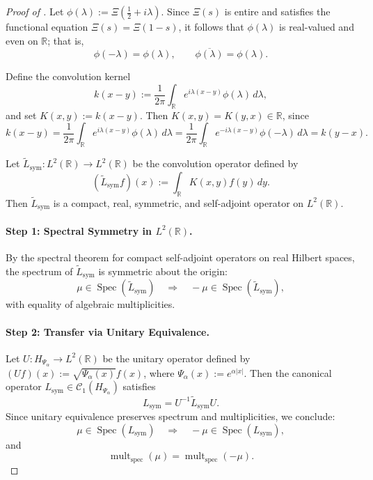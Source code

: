 \begin{proof}[Proof of ]
Let \( \phi(\lambda) := \Xi\left(\tfrac{1}{2} + i\lambda\right) \). Since \( \Xi(s) \) is entire and satisfies the functional equation \( \Xi(s) = \Xi(1 - s) \), it follows that \( \phi(\lambda) \) is real-valued and even on \( \mathbb{R} \); that is,
\[
\phi(-\lambda) = \phi(\lambda), \qquad \overline{\phi(\lambda)} = \phi(\lambda).
\]

Define the convolution kernel
\[
k(x - y) := \frac{1}{2\pi} \int_{\mathbb{R}} e^{i\lambda(x - y)} \phi(\lambda)\, d\lambda,
\]
and set \( K(x, y) := k(x - y) \). Then \( K(x, y) = K(y, x) \in \mathbb{R} \), since
\[
k(x - y) = \frac{1}{2\pi} \int_{\mathbb{R}} e^{i\lambda(x - y)} \phi(\lambda)\, d\lambda = \frac{1}{2\pi} \int_{\mathbb{R}} e^{-i\lambda(x - y)} \phi(-\lambda)\, d\lambda = k(y - x).
\]

Let \( \widetilde{L}_{\mathrm{sym}} \colon L^2(\mathbb{R}) \to L^2(\mathbb{R}) \) be the convolution operator defined by
\[
(\widetilde{L}_{\mathrm{sym}} f)(x) := \int_{\mathbb{R}} K(x, y) f(y)\, dy.
\]
Then \( \widetilde{L}_{\mathrm{sym}} \) is a compact, real, symmetric, and self-adjoint operator on \( L^2(\mathbb{R}) \).

\paragraph{Step 1: Spectral Symmetry in \( L^2(\mathbb{R}) \).}
By the spectral theorem for compact self-adjoint operators on real Hilbert spaces, the spectrum of \( \widetilde{L}_{\mathrm{sym}} \) is symmetric about the origin:
\[
\mu \in \operatorname{Spec}(\widetilde{L}_{\mathrm{sym}}) \quad \Longrightarrow \quad -\mu \in \operatorname{Spec}(\widetilde{L}_{\mathrm{sym}}),
\]
with equality of algebraic multiplicities.

\paragraph{Step 2: Transfer via Unitary Equivalence.}
Let \( U \colon H_{\Psi_\alpha} \to L^2(\mathbb{R}) \) be the unitary operator defined by \( (Uf)(x) := \sqrt{\Psi_\alpha(x)} f(x) \), where \( \Psi_\alpha(x) := e^{\alpha |x|} \). Then the canonical operator \( L_{\mathrm{sym}} \in \mathcal{C}_1(H_{\Psi_\alpha}) \) satisfies
\[
L_{\mathrm{sym}} = U^{-1} \widetilde{L}_{\mathrm{sym}} U.
\]
Since unitary equivalence preserves spectrum and multiplicities, we conclude:
\[
\mu \in \operatorname{Spec}(L_{\mathrm{sym}}) \quad \Longrightarrow \quad -\mu \in \operatorname{Spec}(L_{\mathrm{sym}}),
\]
and
\[
\operatorname{mult}_{\mathrm{spec}}(\mu) = \operatorname{mult}_{\mathrm{spec}}(-\mu).
\]
\end{proof}
